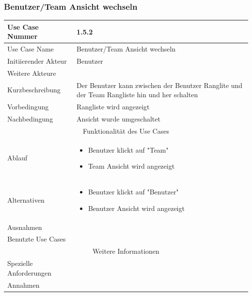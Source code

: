 \documentclass[10pt,a4paper]{article}
\begin{document}
\subsubsection{Benutzer/Team Ansicht wechseln}
	\begin{tabularx}{\textwidth}{|l|X|}
	\hline Use Case Nummer & 1.5.2 \\ 
	\hline Use Case Name & Benutzer/Team Ansicht wechseln \\ 
	\hline Initiierender Akteur & Benutzer \\
	\hline Weitere Akteure &  \\
	\hline Kurzbeschreibung & Der Benutzer kann zwischen der Benutzer Ranglite und der Team Rangliste hin und her schalten \\
	\hline Vorbedingung & Rangliste wird angezeigt \\
	\hline Nachbedingung & Ansicht wurde umgeschaltet \\
	\hline \multicolumn{2}{|c|}{Funktionalität des Use Cases}\\
	\hline Ablauf & \begin{itemize}
		\item Benutzer klickt auf "Team"
		\item Team Ansicht wird angezeigt
	\end{itemize} \\
	\hline Alternativen & \begin{itemize}
				\item Benutzer klickt auf "Benutzer"
				\item Benutzer Ansicht wird angezeigt
			\end{itemize} \\
	\hline Ausnahmen &  \\
	\hline Benutzte Use Cases &  \\
	\hline \multicolumn{2}{|c|}{Weitere Informationen} \\
	\hline Spezielle Anforderungen &  \\
	\hline Annahmen &  \\
	\hline
	\end{tabularx}
		
\end{document}
